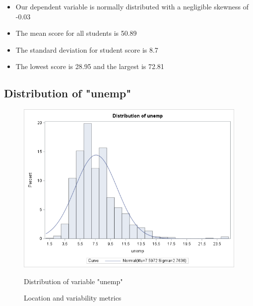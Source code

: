 \documentclass[12pt]{article}
\begin{document}
\begin{itemize}
    \item Our dependent variable is normally distributed with a negligible skewness of -0.03
    \item The mean score for all students is 50.89
    \item The standard deviation for student score is 8.7
    \item The lowest score is 28.95 and the largest is 72.81
\end{itemize}

\subsection{Distribution of "unemp"}
\begin{figure}[h]
    \centering
    \begin{minipage}[t]{0.65\textwidth}
        \vspace{0pt}
        \centering
        \includegraphics[width=\textwidth]{images/unemp_hist.png}
        \caption{Distribution of variable "unemp"}
        \label{fig:unemp_dist}
    \end{minipage}\hfill
    \begin{minipage}[t]{0.3\textwidth}
        \vspace{15pt}
        \centering
        
        \caption{Location and variability metrics}
        \label{fig:unemp_measures}
    \end{minipage}
    \label{fig:unemp_fig}
\end{figure}
\end{document}
